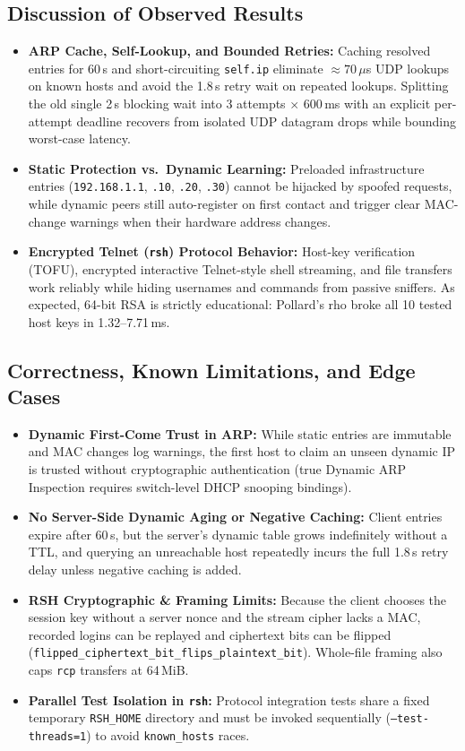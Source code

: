 \documentclass[11pt,a4paper]{article}
\begin{document}
\subsection{Discussion of Observed Results}
\begin{itemize}
  \item \textbf{ARP Cache, Self-Lookup, and Bounded Retries:} Caching resolved entries for 60\,s and short-circuiting \texttt{self.ip} eliminate $\approx 70$\,$\mu$s UDP lookups on known hosts and avoid the 1.8\,s retry wait on repeated lookups. Splitting the old single 2\,s blocking wait into 3 attempts $\times$ 600\,ms with an explicit per-attempt deadline recovers from isolated UDP datagram drops while bounding worst-case latency.
  \item \textbf{Static Protection vs.\ Dynamic Learning:} Preloaded infrastructure entries (\texttt{192.168.1.1}, \texttt{.10}, \texttt{.20}, \texttt{.30}) cannot be hijacked by spoofed requests, while dynamic peers still auto-register on first contact and trigger clear MAC-change warnings when their hardware address changes.
  \item \textbf{Encrypted Telnet (\texttt{rsh}) Protocol Behavior:} Host-key verification (TOFU), encrypted interactive Telnet-style shell streaming, and file transfers work reliably while hiding usernames and commands from passive sniffers. As expected, 64-bit RSA is strictly educational: Pollard's rho broke all 10 tested host keys in 1.32--7.71\,ms.
\end{itemize}

\subsection{Correctness, Known Limitations, and Edge Cases}
\begin{itemize}
  \item \textbf{Dynamic First-Come Trust in ARP:} While static entries are immutable and MAC changes log warnings, the first host to claim an unseen dynamic IP is trusted without cryptographic authentication (true Dynamic ARP Inspection requires switch-level DHCP snooping bindings).
  \item \textbf{No Server-Side Dynamic Aging or Negative Caching:} Client entries expire after 60\,s, but the server's dynamic table grows indefinitely without a TTL, and querying an unreachable host repeatedly incurs the full 1.8\,s retry delay unless negative caching is added.
  \item \textbf{RSH Cryptographic \& Framing Limits:} Because the client chooses the session key without a server nonce and the stream cipher lacks a MAC, recorded logins can be replayed and ciphertext bits can be flipped (\texttt{flipped\_ciphertext\_bit\_flips\_plaintext\_bit}). Whole-file framing also caps \texttt{rcp} transfers at 64\,MiB.
  \item \textbf{Parallel Test Isolation in \texttt{rsh}:} Protocol integration tests share a fixed temporary \texttt{RSH\_HOME} directory and must be invoked sequentially (\texttt{--test-threads=1}) to avoid \texttt{known\_hosts} races.
\end{itemize}
\end{document}
